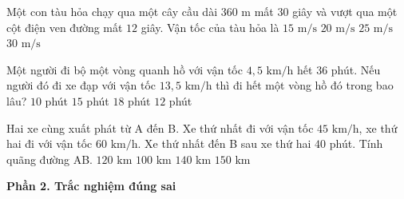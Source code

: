 \begin{ex} %
Một con tàu hỏa chạy qua một cây cầu dài $360\text{ m}$ mất $30$ giây và vượt qua một cột điện ven đường mất $12$ giây. Vận tốc của tàu hỏa là
\choice
{$15\text{ m/s}$}
{\True $20\text{ m/s}$}
{$25\text{ m/s}$}
{$30\text{ m/s}$}
\end{ex}

\begin{ex} %
Một người đi bộ một vòng quanh hồ với vận tốc $4{,}5\text{ km/h}$ hết $36$ phút. Nếu người đó đi xe đạp với vận tốc $13{,}5\text{ km/h}$ thì đi hết một vòng hồ đó trong bao lâu?
\choice
{$10$ phút}
{$15$ phút}
{$18$ phút}
{\True $12$ phút}
\end{ex}

\begin{ex} %
Hai xe cùng xuất phát từ A đến B. Xe thứ nhất đi với vận tốc $45\text{ km/h}$, xe thứ hai đi với vận tốc $60\text{ km/h}$. Xe thứ nhất đến B sau xe thứ hai $40$ phút. Tính quãng đường AB.
\choice
{\True $120\text{ km}$}
{$100\text{ km}$}
{$140\text{ km}$}
{$150\text{ km}$}
\end{ex}

\textbf{Phần 2. Trắc nghiệm đúng sai}


